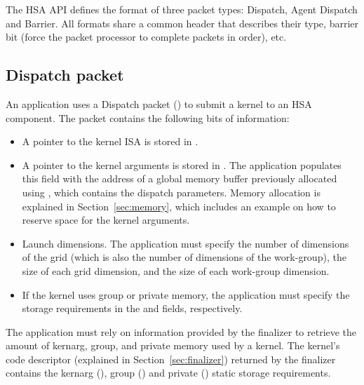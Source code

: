 \documentclass[final,oneside]{book}
\begin{document}
The HSA API defines the format of three packet types: Dispatch, Agent Dispatch
and Barrier. All formats share a common header  that
describes their type, barrier bit (force the packet processor to complete
packets in order), etc.

\subsection{Dispatch packet}\label{dispatch-packet}

An application uses a Dispatch packet () to
submit a kernel to an HSA component. The packet contains the following bits of
information:
\begin{itemize}[itemsep=1pt,topsep=3pt,partopsep=0pt]
\item A pointer to the kernel ISA is stored in
  .
\item A pointer to the kernel arguments is stored in
  . The application populates this
  field with the address of a global memory buffer previously allocated using
  , which contains the dispatch parameters. Memory
  allocation is explained in Section~\ref{sec:memory}, which includes an example
  on how to reserve space for the kernel arguments.
\item Launch dimensions. The application must specify the number of dimensions
  of the grid (which is also the number of dimensions of the work-group), the
  size of each grid dimension, and the size of each work-group dimension.
\item If the kernel uses group or private memory, the application must specify
  the storage requirements in the
   and
   fields, respectively.
\end{itemize}

The application must rely on information provided by the finalizer to retrieve
the amount of kernarg, group, and private memory used by a kernel. The kernel's
code descriptor (explained in Section~\ref{sec:finalizer}) returned by the
finalizer contains the kernarg
(), group
() and
private ()
static storage requirements.
\end{document}

